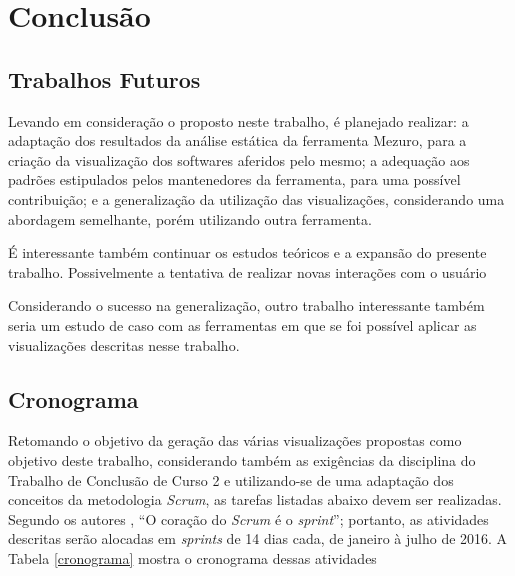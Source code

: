 \chapter[Conclusão]{Conclusão}

\section{Trabalhos Futuros}

Levando em consideração o proposto neste trabalho, é planejado realizar: a
adaptação dos resultados da análise estática da ferramenta Mezuro, para a
criação da visualização dos softwares aferidos pelo mesmo; a adequação aos
padrões estipulados pelos mantenedores da ferramenta, para uma possível
contribuição; e a generalização da utilização das visualizações, considerando uma
abordagem semelhante, porém utilizando outra ferramenta.

É interessante também continuar os estudos teóricos e a expansão do presente
trabalho. Possivelmente a tentativa de realizar novas interações com o usuário

Considerando o sucesso na generalização, outro trabalho interessante também
seria um estudo de caso com as ferramentas em que se foi possível aplicar as
visualizações descritas nesse trabalho.

\section{Cronograma}

Retomando o objetivo da geração das várias visualizações propostas como
objetivo deste trabalho, considerando também as exigências da disciplina do
Trabalho de Conclusão de Curso 2 e utilizando-se de uma adaptação dos conceitos
da metodologia \textit{Scrum}, as tarefas listadas abaixo devem ser realizadas.
Segundo os autores , ``O coração do
\textit{Scrum} é o \textit{sprint}''; portanto, as atividades descritas serão
alocadas em \textit{sprints} de 14 dias cada, de janeiro à julho de 2016. A
Tabela \ref{cronograma} mostra o cronograma dessas atividades

